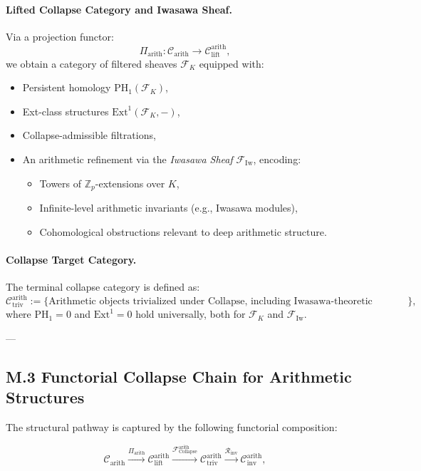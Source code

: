 \documentclass[11pt]{article}
\begin{document}
\paragraph{Lifted Collapse Category and Iwasawa Sheaf.}
Via a projection functor:
\[
\Pi_{\mathrm{arith}} : \mathcal{C}_{\mathrm{arith}} \longrightarrow \mathcal{C}_{\mathrm{lift}}^{\mathrm{arith}},
\]
we obtain a category of filtered sheaves \( \mathcal{F}_K \) equipped with:
\begin{itemize}
  \item Persistent homology \( \mathrm{PH}_1(\mathcal{F}_K) \),
  \item Ext-class structures \( \mathrm{Ext}^1(\mathcal{F}_K, -) \),
  \item Collapse-admissible filtrations,
  \item An arithmetic refinement via the \emph{Iwasawa Sheaf} \( \mathcal{F}_{\mathrm{Iw}} \), encoding:
    \begin{itemize}
      \item Towers of $\mathbb{Z}_p$-extensions over \( K \),
      \item Infinite-level arithmetic invariants (e.g., Iwasawa modules),
      \item Cohomological obstructions relevant to deep arithmetic structure.
    \end{itemize}
\end{itemize}

\paragraph{Collapse Target Category.}
The terminal collapse category is defined as:
\[
\mathcal{C}_{\mathrm{triv}}^{\mathrm{arith}} := \{ \text{Arithmetic objects trivialized under Collapse, including Iwasawa-theoretic refinements} \},
\]
where \( \mathrm{PH}_1 = 0 \) and \( \mathrm{Ext}^1 = 0 \) hold universally, both for \( \mathcal{F}_K \) and \( \mathcal{F}_{\mathrm{Iw}} \).

---

\subsection*{M.3 Functorial Collapse Chain for Arithmetic Structures}

The structural pathway is captured by the following functorial composition:

\[
\mathcal{C}_{\mathrm{arith}} 
\xrightarrow{\Pi_{\mathrm{arith}}} 
\mathcal{C}_{\mathrm{lift}}^{\mathrm{arith}} 
\xrightarrow{\mathcal{F}_{\mathrm{Collapse}}^{\mathrm{arith}}} 
\mathcal{C}_{\mathrm{triv}}^{\mathrm{arith}} 
\xrightarrow{\mathcal{R}_{\mathrm{inv}}} 
\mathcal{C}_{\mathrm{inv}}^{\mathrm{arith}},
\]
\end{document}

